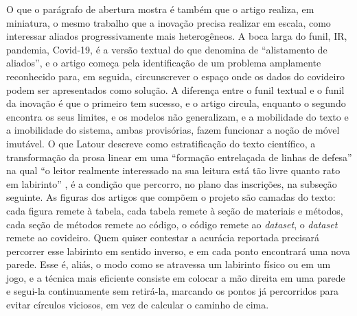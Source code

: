 O que o parágrafo de abertura mostra é também que o artigo realiza, em miniatura, o mesmo trabalho que a inovação precisa realizar em escala, como interessar aliados progressivamente mais heterogêneos. A boca larga do funil, IR, pandemia, Covid-19, é a versão textual do que \textcite{AkrichCallonLatour2002} denomina de \enquote{alistamento de aliados}, e o artigo começa pela identificação de um problema amplamente reconhecido para, em seguida, circunscrever o espaço onde os dados do covideiro podem ser apresentados como solução. A diferença entre o funil textual e o funil da inovação é que o primeiro tem sucesso, e o artigo circula, enquanto o segundo encontra os seus limites, e os modelos não generalizam, e a mobilidade do texto e a imobilidade do sistema, ambas provisórias, fazem funcionar a noção de móvel imutável. O que Latour descreve como estratificação do texto científico, a transformação da prosa linear em uma \enquote{formação entrelaçada de linhas de defesa} na qual \enquote{o leitor realmente interessado na sua leitura está tão livre quanto rato em labirinto} \parencite[p.~82]{Latour2011CienciaEmAcao}, é a condição que percorro, no plano das inscrições, na subseção seguinte. As figuras dos artigos que compõem o projeto são camadas do texto: cada figura remete à tabela, cada tabela remete à seção de materiais e métodos, cada seção de métodos remete ao código, o código remete ao \textit{dataset}, o \textit{dataset} remete ao covideiro. Quem quiser contestar a acurácia reportada precisará percorrer esse labirinto em sentido inverso, e em cada ponto encontrará uma nova parede. Esse é, aliás, o modo como se atravessa um labirinto físico ou em um jogo, e a técnica mais eficiente consiste em colocar a mão direita em uma parede e segui-la continuamente sem retirá-la, marcando os pontos já percorridos para evitar círculos viciosos, em vez de calcular o caminho de cima.

